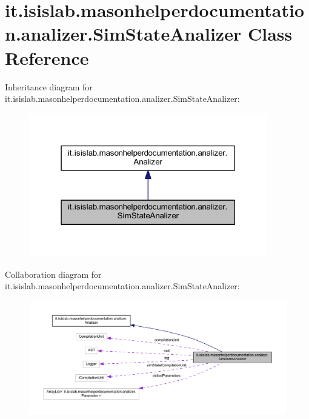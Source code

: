 \hypertarget{classit_1_1isislab_1_1masonhelperdocumentation_1_1analizer_1_1_sim_state_analizer}{\section{it.\-isislab.\-masonhelperdocumentation.\-analizer.\-Sim\-State\-Analizer Class Reference}
\label{classit_1_1isislab_1_1masonhelperdocumentation_1_1analizer_1_1_sim_state_analizer}
}


Inheritance diagram for it.\-isislab.\-masonhelperdocumentation.\-analizer.\-Sim\-State\-Analizer\-:\nopagebreak
\begin{figure}[H]
\begin{center}
\leavevmode
\includegraphics[width=295pt]{classit_1_1isislab_1_1masonhelperdocumentation_1_1analizer_1_1_sim_state_analizer__inherit__graph}
\end{center}
\end{figure}


Collaboration diagram for it.\-isislab.\-masonhelperdocumentation.\-analizer.\-Sim\-State\-Analizer\-:\nopagebreak
\begin{figure}[H]
\begin{center}
\leavevmode
\includegraphics[width=350pt]{classit_1_1isislab_1_1masonhelperdocumentation_1_1analizer_1_1_sim_state_analizer__coll__graph}
\end{center}
\end{figure}
